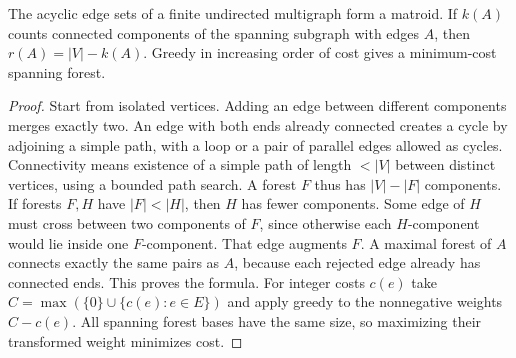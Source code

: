 \begin{proposition}\label{result51}
The acyclic edge sets of a finite undirected multigraph form a matroid. If $k(A)$ counts connected components of the spanning subgraph with edges $A$, then $r(A)=|V|-k(A)$. Greedy in increasing order of cost gives a minimum-cost spanning forest.
\end{proposition}
\begin{proof}
Start from isolated vertices. Adding an edge between different components merges exactly two. An edge with both ends already connected creates a cycle by adjoining a simple path, with a loop or a pair of parallel edges allowed as cycles. Connectivity means existence of a simple path of length $<|V|$ between distinct vertices, using a bounded path search. A forest $F$ thus has $|V|-|F|$ components. If forests $F,H$ have $|F|<|H|$, then $H$ has fewer components. Some edge of $H$ must cross between two components of $F$, since otherwise each $H$-component would lie inside one $F$-component. That edge augments $F$. A maximal forest of $A$ connects exactly the same pairs as $A$, because each rejected edge already has connected ends. This proves the formula. For integer costs $c(e)$ take $C=\max(\{0\}\cup\{c(e):e\in E\})$ and apply greedy to the nonnegative weights $C-c(e)$. All spanning forest bases have the same size, so maximizing their transformed weight minimizes cost.
\end{proof}

